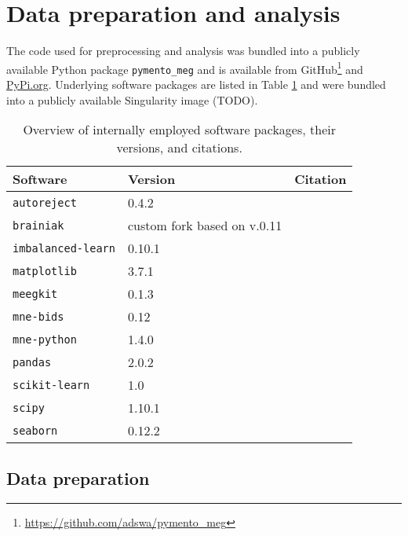 \section{Data preparation and analysis}

The code used for preprocessing and analysis was bundled into a publicly available Python package \texttt{pymento\_meg} and is available from GitHub\footnote{\url{https://github.com/adswa/pymento_meg}} and \url{PyPi.org}.
Underlying software packages are listed in Table \ref{tab:software} and were bundled into a publicly available Singularity image (TODO).
\begin{center}
\begin{table}
	\begin{tabular}{ l l l }
		\hline
		Software	& Version 	& Citation \\ \hline
		\texttt{autoreject} 	& 0.4.2 	& \citet{jas2017autoreject} \\
		\texttt{brainiak} 	& custom fork based on v.0.11 & \citet{brainiak} \\
		\texttt{imbalanced-learn} & 0.10.1 & \citet{JMLR:v18:16-365} \\
		\texttt{matplotlib} 	& 3.7.1 	& \citet{Hunter2007} \\
		\texttt{meegkit} 	& 0.1.3 	& \citet{barascud2022} \\
		\texttt{mne-bids} 	& 0.12 		&  \citet{Appelhoff2019} \\
		\texttt{mne-python} 	& 1.4.0		& \citet{Gramfort_MEG_and_EEG_2013} \\
		\texttt{pandas} 		& 2.0.2 	& \citet{The_pandas_development_team_pandas-dev_pandas_Pandas} \\
		\texttt{scikit-learn} & 1.0	 	& \citet{scikit-learn} \\
		\texttt{scipy} 		& 1.10.1 	& \citet{2020SciPy-NMeth} \\
		\texttt{seaborn} 	& 0.12.2 	& \citet{Waskom2021}
	\end{tabular}
	\caption[Overview of software packages]{Overview of internally employed software packages, their versions, and citations.}
	\label{tab:software}
\end{table}
\end{center}

\subsection{Data preparation}


